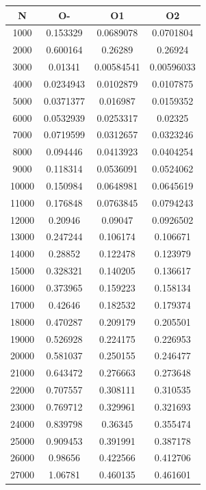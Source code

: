 \begin{center}
\begin{tabular}{| c | c | c | c |}
\hline
\textbf{N} & \textbf{O-} & \textbf{O1} & \textbf{O2} \\ \hline
1000 & 0.153329 & 0.0689078 & 0.0701804 \\ \hline
2000 & 0.600164 & 0.26289 & 0.26924 \\ \hline
3000 & 0.01341 & 0.00584541 & 0.00596033 \\ \hline
4000 & 0.0234943 & 0.0102879 & 0.0107875 \\ \hline
5000 & 0.0371377 & 0.016987 & 0.0159352 \\ \hline
6000 & 0.0532939 & 0.0253317 & 0.02325 \\ \hline
7000 & 0.0719599 & 0.0312657 & 0.0323246 \\ \hline
8000 & 0.094446 & 0.0413923 & 0.0404254 \\ \hline
9000 & 0.118314 & 0.0536091 & 0.0524062 \\ \hline
10000 & 0.150984 & 0.0648981 & 0.0645619 \\ \hline
11000 & 0.176848 & 0.0763845 & 0.0794243 \\ \hline
12000 & 0.20946 & 0.09047 & 0.0926502 \\ \hline
13000 & 0.247244 & 0.106174 & 0.106671 \\ \hline
14000 & 0.28852 & 0.122478 & 0.123979 \\ \hline
15000 & 0.328321 & 0.140205 & 0.136617 \\ \hline
16000 & 0.373965 & 0.159223 & 0.158134 \\ \hline
17000 & 0.42646 & 0.182532 & 0.179374 \\ \hline
18000 & 0.470287 & 0.209179 & 0.205501 \\ \hline
19000 & 0.526928 & 0.224175 & 0.226953 \\ \hline
20000 & 0.581037 & 0.250155 & 0.246477 \\ \hline
21000 & 0.643472 & 0.276663 & 0.273648 \\ \hline
22000 & 0.707557 & 0.308111 & 0.310535 \\ \hline
23000 & 0.769712 & 0.329961 & 0.321693 \\ \hline
24000 & 0.839798 & 0.36345 & 0.355474 \\ \hline
25000 & 0.909453 & 0.391991 & 0.387178 \\ \hline
26000 & 0.98656 & 0.422566 & 0.412706 \\ \hline
27000 & 1.06781 & 0.460135 & 0.461601 \\ \hline

\end{tabular}
\end{center}
